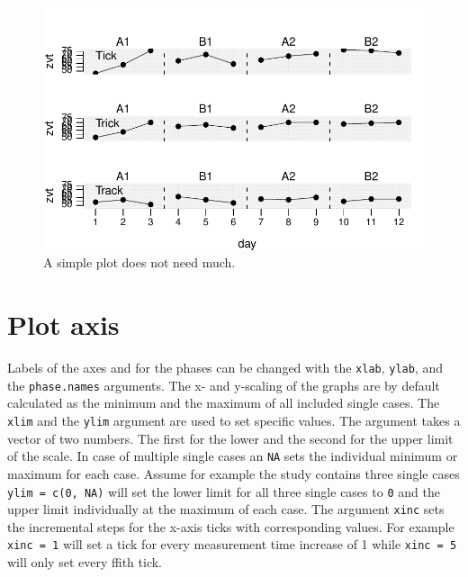\documentclass[
  letterpaper,
  DIV=11,
  numbers=noendperiod]{scrreprt}
\begin{document}
\begin{figure}[H]

{\centering \includegraphics{./ch_creating_a_plot_files/figure-pdf/ex-simple-plot-1.pdf}

}

\caption{A simple plot does not need much.}

\end{figure}

\hypertarget{plot-axis}{%
\section{Plot axis}\label{plot-axis}}

Labels of the axes and for the phases can be changed with the
\texttt{xlab}, \texttt{ylab}, and the \texttt{phase.names} arguments.
The x- and y-scaling of the graphs are by default calculated as the
minimum and the maximum of all included single cases. The \texttt{xlim}
and the \texttt{ylim} argument are used to set specific values. The
argument takes a vector of two numbers. The first for the lower and the
second for the upper limit of the scale. In case of multiple single
cases an \texttt{NA} sets the individual minimum or maximum for each
case. Assume for example the study contains three single cases
\texttt{ylim\ =\ c(0,\ NA)} will set the lower limit for all three
single cases to \texttt{0} and the upper limit individually at the
maximum of each case. The argument \texttt{xinc} sets the incremental
steps for the x-axis ticks with corresponding values. For example
\texttt{xinc\ =\ 1} will set a tick for every measurement time increase
of 1 while \texttt{xinc\ =\ 5} will only set every ffith tick.
\end{document}
